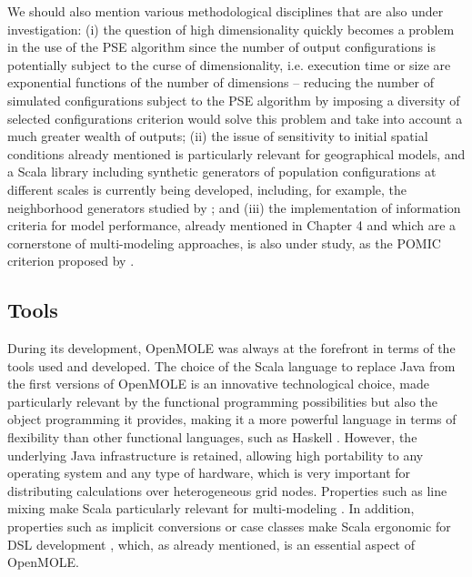 \documentclass[10pt]{article}
\begin{document}
We should also mention various methodological disciplines that are also under investigation: (i) the question of high dimensionality quickly becomes a problem in the use of the PSE algorithm since the number of output configurations is potentially subject to the curse of dimensionality, i.e. execution time or size are exponential functions of the number of dimensions – reducing the number of simulated configurations subject to the PSE algorithm by imposing a diversity of selected configurations criterion would solve this problem and take into account a much greater wealth of outputs; (ii) the issue of sensitivity to initial spatial conditions already mentioned  \citep{raimbault2018space} is particularly relevant for geographical models, and a Scala library including synthetic generators of population configurations at different scales is currently being developed, including, for example, the neighborhood generators studied by \cite{raimbault2019generating}; and (iii) the implementation of information criteria for model performance, already mentioned in Chapter 4 and which are a cornerstone of multi-modeling approaches, is also under study, as the POMIC criterion proposed by \cite{piou2009proposing}.


\subsection{Tools}

During its development, OpenMOLE was always at the forefront in terms of the tools used and developed. The choice of the Scala language to replace Java from the first versions of OpenMOLE is an innovative technological choice, made particularly relevant by the functional programming possibilities but also the object programming it provides, making it a more powerful language in terms of flexibility than other functional languages, such as Haskell \citep{oliveira2010scala}. However, the underlying Java infrastructure is retained, allowing high portability to any operating system and any type of hardware, which is very important for distributing calculations over heterogeneous grid nodes. Properties such as line mixing make Scala particularly relevant for multi-modeling \citep{odersky2005scalable}. In addition, properties such as implicit conversions or case classes make Scala ergonomic for DSL development \citep{sloane2008experiences}, which, as already mentioned, is an essential aspect of OpenMOLE.
\end{document}
